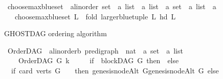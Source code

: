 \begin{isabellebody}
\begin{isamarkuptext}
\end{isamarkuptext}\isamarkuptrue%
\isamarkupfalse%
\ choose{\isacharunderscore}{\kern0pt}max{\isacharunderscore}{\kern0pt}blue{\isacharunderscore}{\kern0pt}set\ {\isacharcolon}{\kern0pt}{\isacharcolon}{\kern0pt}\ {\isachardoublequoteopen}{\isacharparenleft}{\kern0pt}{\isacharparenleft}{\kern0pt}{\isacharprime}{\kern0pt}a{\isacharcolon}{\kern0pt}{\isacharcolon}{\kern0pt}linorder\ set\ {\isasymtimes}\ {\isacharprime}{\kern0pt}a\ list{\isacharparenright}{\kern0pt}\ {\isasymtimes}\ {\isacharprime}{\kern0pt}a{\isacharparenright}{\kern0pt}\ list\ {\isasymRightarrow}\ {\isacharparenleft}{\kern0pt}{\isacharparenleft}{\kern0pt}{\isacharprime}{\kern0pt}a\ set\ {\isasymtimes}\ {\isacharprime}{\kern0pt}a\ list{\isacharparenright}{\kern0pt}\ {\isasymtimes}\ {\isacharprime}{\kern0pt}a{\isacharparenright}{\kern0pt}{\isachardoublequoteclose}\isanewline
\ \ \ {\isachardoublequoteopen}choose{\isacharunderscore}{\kern0pt}max{\isacharunderscore}{\kern0pt}blue{\isacharunderscore}{\kern0pt}set\ L\ {\isacharequal}{\kern0pt}\ fold\ {\isacharparenleft}{\kern0pt}larger{\isacharunderscore}{\kern0pt}blue{\isacharunderscore}{\kern0pt}tuple{\isacharparenright}{\kern0pt}\ L\ {\isacharparenleft}{\kern0pt}hd\ L{\isacharparenright}{\kern0pt}{\isachardoublequoteclose}%
\begin{isamarkuptext}%
GHOSTDAG ordering algorithm%
\end{isamarkuptext}\isamarkuptrue%
\isamarkupfalse%
\ OrderDAG\ {\isacharcolon}{\kern0pt}{\isacharcolon}{\kern0pt}\ {\isachardoublequoteopen}{\isacharparenleft}{\kern0pt}{\isacharprime}{\kern0pt}a{\isacharcolon}{\kern0pt}{\isacharcolon}{\kern0pt}linorder{\isacharcomma}{\kern0pt}{\isacharprime}{\kern0pt}b{\isacharparenright}{\kern0pt}\ pre{\isacharunderscore}{\kern0pt}digraph\ {\isasymRightarrow}\ nat\ {\isasymRightarrow}\ {\isacharparenleft}{\kern0pt}{\isacharprime}{\kern0pt}a\ set\ {\isasymtimes}\ {\isacharprime}{\kern0pt}a\ list{\isacharparenright}{\kern0pt}{\isachardoublequoteclose}\ \isanewline
\ \ \isanewline
\ \ \ \ {\isachardoublequoteopen}OrderDAG\ G\ k\ {\isacharequal}{\kern0pt}\ \ \isanewline
\ \ {\isacharparenleft}{\kern0pt}if\ {\isacharparenleft}{\kern0pt}{\isasymnot}\ blockDAG\ G{\isacharparenright}{\kern0pt}\ then\ {\isacharparenleft}{\kern0pt}{\isacharbraceleft}{\kern0pt}{\isacharbraceright}{\kern0pt}{\isacharcomma}{\kern0pt}{\isacharbrackleft}{\kern0pt}{\isacharbrackright}{\kern0pt}{\isacharparenright}{\kern0pt}\ else\ \isanewline
\ \ if\ {\isacharparenleft}{\kern0pt}card\ {\isacharparenleft}{\kern0pt}verts\ G{\isacharparenright}{\kern0pt}\ {\isacharequal}{\kern0pt}\ {}{\isacharparenright}{\kern0pt}\ \ then\ {\isacharparenleft}{\kern0pt}{\isacharbraceleft}{\kern0pt}genesis{\isacharunderscore}{\kern0pt}nodeAlt\ G{\isacharbraceright}{\kern0pt}{\isacharcomma}{\kern0pt}{\isacharbrackleft}{\kern0pt}genesis{\isacharunderscore}{\kern0pt}nodeAlt\ G{\isacharbrackright}{\kern0pt}{\isacharparenright}{\kern0pt}\ else\isanewline

\end{isabellebody}
